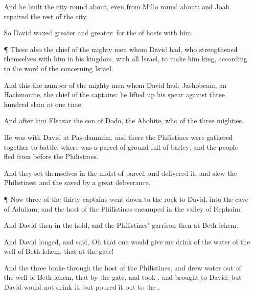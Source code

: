 {And he
built the
city round
about, even from
Millo round
about: and
Joab
repaired the
rest of the
city.

So
David
waxed
greater and
greater: for the
{} of
hosts
{} with him.


\par }{\PP {}¶ These also
{} the
chief of the mighty
men whom
David had, who
strengthened themselves with him in his
kingdom,
{} with all
Israel, to make him
king, according to the
word of the
{} concerning
Israel.

And this
{} the
number of the mighty
men whom
David had;
Jashobeam, an
Hachmonite, the
chief of the
captains: he lifted
up his
spear against
three
hundred
slain
{} at
one
time.

And
after him
{}
Eleazar the
son of
Dodo, the
Ahohite, who
{} of the
three
mighties.

He was with
David at
Pas-dammim, and there the
Philistines were gathered
together to
battle, where was a
parcel of
ground
full of
barley; and the
people
fled from
before the
Philistines.

And they
set themselves in the
midst of
{}
parcel, and
delivered it, and
slew the
Philistines; and the
{}
saved
{} by a
great
deliverance.


\par }{\PP {}¶ Now
three of the
thirty
captains went
down to the
rock to
David, into the
cave of
Adullam; and the
host of the
Philistines
encamped in the
valley of
Rephaim.

And
David
{} then in the
hold, and the
Philistines’
garrison
{} then at
Beth-lehem.

And
David
longed, and
said, Oh that one would give me
drink of the
water of the
well of
Beth-lehem, that
{} at the
gate!

And the
three brake
through the
host of the
Philistines, and
drew
water out of the
well of
Beth-lehem, that
{} by the
gate, and
took
{}, and
brought
{} to
David: but
David
would not
drink
{} it, but poured it
out to the
{},

}
